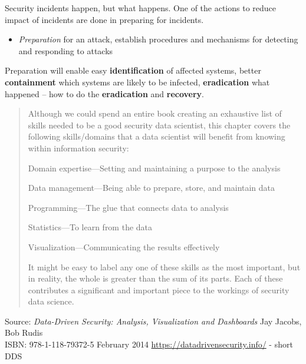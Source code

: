 \documentclass[Screen16to9,17pt]{foils}
\begin{document}


Security incidents happen, but what happens. One of the actions to reduce impact of incidents are done in preparing for incidents.

\begin{itemize}
\item \emph{Preparation} for an attack, establish procedures and mechanisms for detecting and responding to attacks
\end{itemize}

Preparation will enable easy {\bf identification} of affected systems, better {\bf containment} which systems are likely to be infected, {\bf eradication} what happened -- how to do the {\bf eradication} and {\bf recovery}.



\begin{quote}
Although we could spend an entire book creating an exhaustive list of skills needed to be a good security data scientist, this chapter covers the following skills/domains that a data scientist will benefit from
knowing within information security:
\begin{list2}
\item Domain expertise—Setting and maintaining a purpose to the analysis
\item Data management—Being able to prepare, store, and maintain data
\item Programming—The glue that connects data to analysis
\item Statistics—To learn from the data
\item Visualization—Communicating the results effectively
\end{list2}
It might be easy to label any one of these skills as the most important, but in reality, the whole is greater than the sum of its parts. Each of these contributes a significant and important piece to the workings of
security data science.
\end{quote}

Source: \emph{Data-Driven Security: Analysis, Visualization and Dashboards} Jay Jacobs, Bob Rudis\\
ISBN: 978-1-118-79372-5 February 2014 \url{https://datadrivensecurity.info/} - short DDS



\myquestionspage



\end{document}
